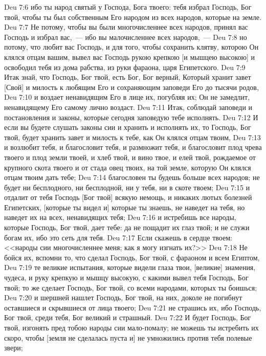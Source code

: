\vs Deu 7:6 ибо ты народ святый у Господа, Бога твоего: тебя избрал Господь, Бог твой, чтобы ты был собственным Его народом из всех народов, которые на земле.
\vs Deu 7:7 Не потому, чтобы вы были многочисленнее всех народов, принял вас Господь и избрал вас,~--- ибо вы малочисленнее всех народов,~---
\vs Deu 7:8 но потому, что любит вас Господь, и для того, чтобы сохранить клятву, которою Он клялся отцам вашим, вывел вас Господь рукою крепкою [и мышцею высокою] и освободил тебя из дома рабства, из руки фараона, царя Египетского.
\vs Deu 7:9 Итак знай, что Господь, Бог твой, есть Бог, Бог верный, Который хранит завет [Свой] и милость к любящим Его и сохраняющим заповеди Его до тысячи родов,
\vs Deu 7:10 и воздает ненавидящим Его в лице их, погубляя их; Он не замедлит, ненавидящему Его самому лично воздаст.
\rsbpar\vs Deu 7:11 Итак, соблюдай заповеди и постановления и законы, которые сегодня заповедую тебе исполнять.
\vs Deu 7:12 И если вы будете слушать законы сии и хранить и исполнять их, то Господь, Бог твой, будет хранить завет и милость к тебе, как Он клялся отцам твоим,
\vs Deu 7:13 и возлюбит тебя, и благословит тебя, и размножит тебя, и благословит плод чрева твоего и плод земли твоей, и хлеб твой, и вино твое, и елей твой, рождаемое от крупного скота твоего и от стада овец твоих, на той земле, которую Он клялся отцам твоим дать тебе;
\vs Deu 7:14 благословен ты будешь больше всех народов; не будет ни бесплодного, ни бесплодной, ни у тебя, ни в скоте твоем;
\vs Deu 7:15 и отдалит от тебя Господь [Бог твой] всякую немощь, и никаких лютых болезней Египетских, [которые ты видел и] которые ты знаешь, не наведет на тебя, но наведет их на всех, ненавидящих тебя;
\vs Deu 7:16 и истребишь все народы, которые Господь, Бог твой, дает тебе: да не пощадит их глаз твой; и не служи богам их, ибо это сеть для тебя.
\vs Deu 7:17 Если скажешь в сердце твоем: <<народы сии многочисленнее меня; как я могу изгнать их?>>
\vs Deu 7:18 Не бойся их, вспомни то, что сделал Господь, Бог твой, с фараоном и всем Египтом,
\vs Deu 7:19 те великие испытания, которые видели глаза твои, [великие] знамения, чудеса, и руку крепкую и мышцу высокую, с какими вывел тебя Господь, Бог твой; то же сделает Господь, Бог твой, со всеми народами, которых ты боишься;
\vs Deu 7:20 и шершней нашлет Господь, Бог твой, на них, доколе не погибнут оставшиеся и скрывшиеся от лица твоего;
\vs Deu 7:21 не страшись их, ибо Господь, Бог твой, среди тебя, Бог великий и страшный.
\vs Deu 7:22 И будет Господь, Бог твой, изгонять пред тобою народы сии мало-помалу; не можешь ты истребить их скоро, чтобы [земля не сделалась пуста и] не умножились против тебя полевые звери;
